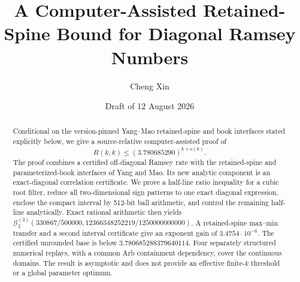 \documentclass[11pt,reqno]{amsart}
\title[A retained-spine Ramsey bound]{A Computer-Assisted Retained-Spine Bound for Diagonal Ramsey Numbers}
\author{Cheng Xin}
\date{Draft of 12 August 2026}
\theoremstyle{definition}
\theoremstyle{remark}
\newcommand{\cG}{\mathcal G}
\begin{document}
\begin{abstract}
Conditional on the version-pinned Yang--Mao retained-spine and book
interfaces stated explicitly below, we give a source-relative
computer-assisted proof of
\[
  R(k,k)\le (3.780685290)^{k+o(k)}.
\]
The proof combines a certified off-diagonal Ramsey rate with the retained-spine
and parameterized-book interfaces of Yang and Mao.  Its new analytic component
is an exact-diagonal correlation certificate.  We prove a half-line ratio
inequality for a cubic root filter, reduce all two-dimensional sign patterns to
one exact diagonal expression, enclose the compact interval by 512-bit ball
arithmetic, and control the remaining half-line analytically.  Exact rational
arithmetic then yields
\(
\cG_2^{(3)}(330867/500000,
12366348252219/1250000000000)
\).
A retained-spine max--min transfer and a second interval certificate give an
exponent gain of \(3.4754\cdot10^{-6}\).  The certified unrounded base is below
\(3.780685288379640114\).  Four separately structured numerical replays,
with a common Arb containment dependency, cover the continuous domains.
The result is asymptotic and does not provide an
effective finite-\(k\) threshold or a global parameter optimum.
\end{abstract}

\maketitle
\tableofcontents









\appendix






\end{document}
